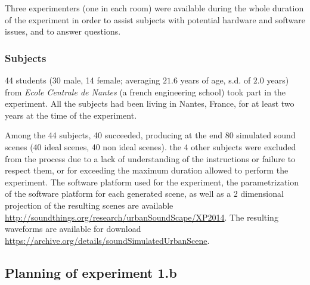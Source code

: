 \documentclass[12pt]{elsarticle}
\begin{document}

Three experimenters (one in each room) were available during the whole duration of the experiment in order to assist subjects with potential hardware and software issues, and to answer questions.

\subsubsection*{Subjects}


44 students (30 male, 14 female; averaging $21.6$ years of age, s.d. of $2.0$ years) from \emph{Ecole Centrale de Nantes} (a french engineering school) took part in the experiment. All the subjects had been living in Nantes, France, for at least two years at the time of the experiment.


Among the 44 subjects, 40 succeeded, producing at the end 80 simulated sound scenes (40 ideal scenes, 40 non ideal scenes). the 4 other subjects were excluded from the process due to a lack of understanding of the instructions or failure to respect them, or for exceeding the maximum duration allowed to perform the experiment.  The software platform used for the experiment, the parametrization of the software platform for each generated scene, as well as a 2 dimensional projection of the resulting scenes are available \url{http://soundthings.org/research/urbanSoundScape/XP2014}. The resulting waveforms are available for download \url{https://archive.org/details/soundSimulatedUrbanScene}.

\subsection{Planning of experiment 1.b}
\label{sec:xp1b_plan}
\end{document}

